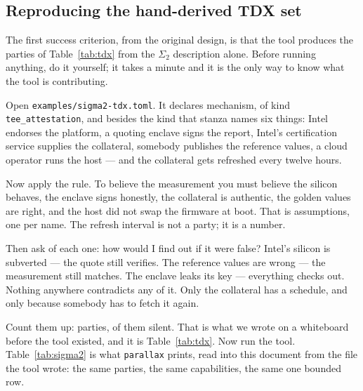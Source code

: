 \documentclass[11pt]{article}
\newcommand{\parallax}{\texttt{parallax}}
\newcommand{\Never}{\infty}
\newcommand{\ub}{\_\allowbreak}
\begin{document}
\subsection{Reproducing the hand-derived TDX set}
\label{sec:tdxrepro}

The first success criterion, from the original design, is that the tool
produces the parties of Table~\ref{tab:tdx} from the $\Sigma_2$ description
alone. Before running anything, do it yourself; it takes a minute and it is
the only way to know what the tool is contributing.

Open \texttt{examples/sigma2-tdx.toml}. It declares \SigmaTwoMechanisms{}
mechanism, of kind \texttt{tee\ub attestation}, and besides the kind that
stanza names six things: Intel
endorses the platform, a quoting enclave signs the report, Intel's
certification service supplies the collateral, somebody publishes the
reference values, a cloud operator runs the host --- and the collateral gets
refreshed every twelve hours.

Now apply the rule. To believe the measurement you must believe the silicon
behaves, the enclave signs honestly, the collateral is authentic, the golden
values are right, and the host did not swap the firmware at boot. That is \SigmaTwoAssumptions{} assumptions, one
per name. The refresh interval is not a party; it is a number.

Then ask of each one: how would I find out if it were false? Intel's silicon
is subverted --- the quote still verifies. The reference values are wrong ---
the measurement still matches. The enclave leaks its key --- everything
checks out. Nothing anywhere contradicts any of it. Only the collateral has a
schedule, and only because somebody has to fetch it again.

Count them up: \SigmaTwoParties{} parties, \SigmaTwoUndetectable{} of them
silent. That is what we wrote on a whiteboard before the tool existed, and it
is
Table~\ref{tab:tdx}. Now run the tool. Table~\ref{tab:sigma2} is what
\parallax{} prints, read into this document from the file the tool wrote:
the same parties, the same capabilities, the same one bounded row.

\begin{table}[h]
\centering\small
\caption{The residual trust set \parallax{} computes for $\Sigma_2$, from
\texttt{parallax solve --format latex}. The
\texttt{tee\ub attestation} rule supplies every capability, every impact, and
\emph{which} row is bounded --- \SigmaTwoUndetectable{} of the
\SigmaTwoParties{} are $\Never$ because the
rule says the endorser, the quoting enclave, the host and the
reference-value provider have no detection mechanism. The deployment file
supplies the \SigmaTwoParties{} identifiers and one number: the collateral
refresh interval, which is the bound in the one row that has one.}
\label{tab:sigma2}

\end{table}
\end{document}
